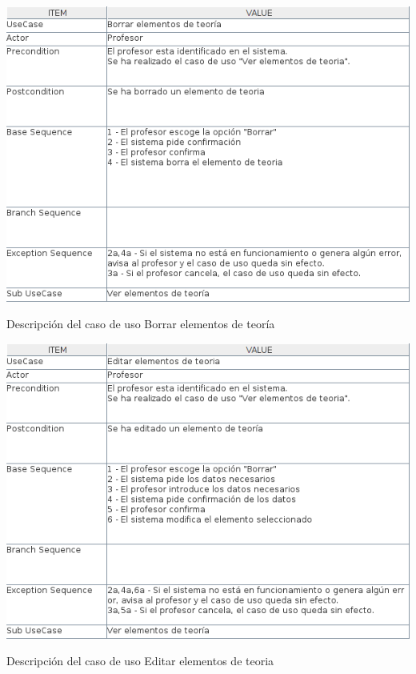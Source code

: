 \documentclass[openright,twoside,10pt]{book}
\begin{document}
    \vspace*{\fill}
    
    \newpage
    
    \vspace*{\fill}
    
    \begin{table}[H]
        \begin{center}
            \includegraphics[width=\textwidth]{img/astah/analisis/casos_de_uso/useCase14.png}
        \end{center}
        \caption{Descripción del caso de uso Borrar elementos de teoría}
    \end{table}
    
    \vspace*{\fill}
    
    \newpage
    
    \vspace*{\fill}
    
    \begin{table}[H]
        \begin{center}
            \includegraphics[width=\textwidth]{img/astah/analisis/casos_de_uso/useCase15.png}
        \end{center}
        \caption{Descripción del caso de uso Editar elementos de teoria}
    \end{table}
    
\end{document}
